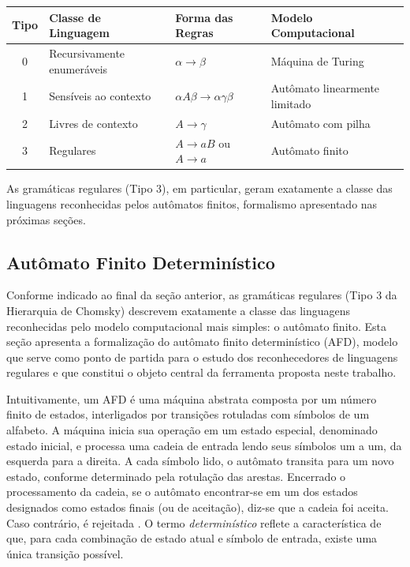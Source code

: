 \documentclass[
    12pt
    ,oneside
    ,a4paper
    ,chapter=TITLE
    ,section=TITLE
    ,sumario=abnt-6027-2012]{abntex2}
\begin{document}
\begin{quadro}[htpb]
    \centering
    \caption{HIERARQUIA DE CHOMSKY}
    \label{quad:chomsky}
    \small
    \setlength{\tabcolsep}{5pt}
    \begin{tabular}{|c|l|l|l|}
        \hline
        \textbf{Tipo} & \textbf{Classe de Linguagem}    & \textbf{Forma das Regras}                & \textbf{Modelo Computacional}    \\
        \hline
        0             & Recursivamente enumeráveis      & $\alpha \to \beta$                       & Máquina de Turing                \\
        1             & Sensíveis ao contexto           & $\alpha A \beta \to \alpha \gamma \beta$ & Autômato linearmente limitado    \\
        2             & Livres de contexto              & $A \to \gamma$                           & Autômato com pilha               \\
        3             & Regulares                       & $A \to aB$ ou $A \to a$                  & Autômato finito                  \\
        \hline
    \end{tabular}
\end{quadro}

As gramáticas regulares (Tipo 3), em particular, geram exatamente a classe das linguagens reconhecidas
pelos autômatos finitos, formalismo apresentado nas próximas seções.

\subsection{Autômato Finito Determinístico}
\label{sec:afd}
Conforme indicado ao final da seção anterior, as gramáticas regulares (Tipo 3 da Hierarquia de
Chomsky) descrevem exatamente a classe das linguagens reconhecidas pelo modelo computacional
mais simples: o autômato finito. Esta seção apresenta a formalização do autômato finito
determinístico (AFD), modelo que serve como ponto de partida para o estudo dos reconhecedores
de linguagens regulares e que constitui o objeto central da ferramenta proposta neste trabalho.

Intuitivamente, um AFD é uma máquina abstrata composta por um número finito de estados,
interligados por transições rotuladas com símbolos de um alfabeto. A máquina inicia sua
operação em um estado especial, denominado estado inicial, e processa uma cadeia de
entrada lendo seus símbolos um a um, da esquerda para a direita. A cada símbolo lido, o autômato
transita para um novo estado, conforme determinado pela rotulação das arestas. Encerrado o
processamento da cadeia, se o autômato encontrar-se em um dos estados designados como
estados finais (ou de aceitação), diz-se que a cadeia foi aceita. Caso
contrário, é rejeitada \cite{hopcroft2006,sipser2012}. O termo
\textit{determinístico} reflete a característica de que, para cada combinação de estado atual e
símbolo de entrada, existe uma única transição possível.
\end{document}
